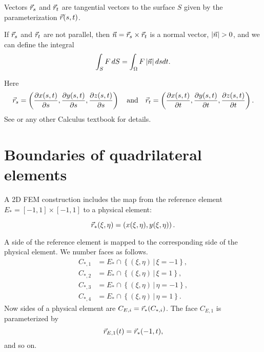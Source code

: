 \documentclass[11pt]{article}
\begin{document}
Vectors $\vec r_{s}$ and $\vec r_{t}$ are tangential vectors to the surface $S$
given by the parameterization $\vec r(s,t)$.

If $\vec r_{s}$ and $\vec r_{t}$ are not parallel, then $\vec n = \vec r_{s} \times \vec r_{t}$ is
a normal vector, $| \vec n | > 0$, and we can define
the integral
\begin{equation}
\label{eq:2}
\int_{S} F\, dS = \int_{\Omega} F\, |\vec n|\, ds dt.
\end{equation}

Here
\begin{equation}
\label{eq:3}
\vec r_{s} = \left(\frac{\partial x(s,t)}{\partial s}, \frac{\partial y(s,t)}{\partial s}, \frac{\partial z(s,t)}{\partial s}\right) \quad \text{and} \quad
\vec r_{t} = \left(\frac{\partial x(s,t)}{\partial t}, \frac{\partial y(s,t)}{\partial t}, \frac{\partial z(s,t)}{\partial t}\right).
\end{equation}
See \cite{Nikolsky1977} or any other Calculus textbook for details.


\section{Boundaries of quadrilateral elements}
\label{sec-3}

A 2D FEM construction includes the map from the reference element
$E_{*} = [-1, 1] \times [-1,1]$ to a physical element:

\begin{equation}
\label{eq:4}
\vec r_{*}(\xi,\eta) = \left( x(\xi,\eta), y(\xi,\eta) \right).
\end{equation}

A side of the reference element is mapped to the corresponding side of
the physical element. We number faces as follows.
\begin{equation}
\label{eq:5}
\begin{aligned}
C_{*,1} &=  E_{*} \cap \left \{ (\xi, \eta)\, |\, \xi = -1 \right \},\\
C_{*,2} &=  E_{*} \cap \left \{ (\xi, \eta)\, |\, \xi = 1  \right \},\\
C_{*,3} &=  E_{*} \cap \left \{ (\xi, \eta)\, |\, \eta = -1 \right \},\\
C_{*,4} &=  E_{*} \cap \left \{ (\xi, \eta)\, |\, \eta = 1  \right \}.
\end{aligned}
\end{equation}
Now sides of a physical element are $C_{E,i} = \vec r_{*}(C_{*,i})$. The
face $C_{E,1}$ is parameterized by
\begin{equation}
\label{eq:6}
\vec r_{E,1}(t) = \vec r_{*}(-1, t),
\end{equation}
and so on.
\end{document}
